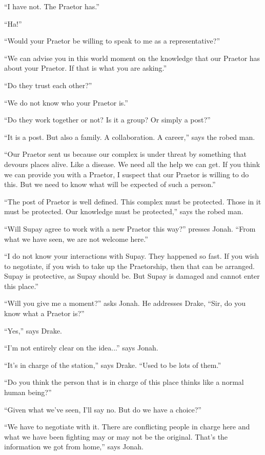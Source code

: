 ``I have not.  The Praetor has.''

``Ha!''

``Would your Praetor be willing to speak to me as a representative?''

``We can advise you in this world moment on the knowledge that our Praetor has about your Praetor.  If that is what you are asking.''

``Do they trust each other?''

``We do not know who your Praetor is.''

``Do they work together or not?  Is it a group?  Or simply a post?''

``It is a post. But also a family.  A collaboration.  A career,'' says the robed man.

``Our Praetor sent us because our complex is under threat by something that devours places alive.  Like a disease. We need all the help we can get.  If you think we can provide you with a Praetor, I suspect that our Praetor is willing to do this.  But we need to know what will be expected of such a person.''

``The post of Praetor is well defined.  This complex must be protected.  Those in it must be protected.  Our knowledge must be protected,'' says the robed man.

``Will Supay agree to work with a new Praetor this way?'' presses Jonah.  ``From what we have seen, we are not welcome here.''

``I do not know your interactions with Supay. They happened so fast.  If you wish to negotiate, if you wish to take up the Praetorship, then that can be arranged.  Supay is protective, as Supay should be.  But Supay is damaged and cannot enter this place.''

``Will you give me a moment?'' asks Jonah.  He addresses Drake, ``Sir, do you know what a Praetor is?''

``Yes,'' says Drake.

``I'm not entirely clear on the idea...'' says Jonah.

``It's in charge of the station,'' says Drake.  ``Used to be lots of them.''

``Do you think the person that is in charge of this place thinks like a normal human being?''

``Given what we've seen, I'll say no.  But do we have a choice?''

``We have to negotiate with it.  There are conflicting people in charge here and what we have been fighting may or may not be the original. That's the information we got from home,'' says Jonah. 



